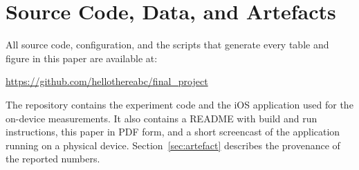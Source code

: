 \appendices

\section{Source Code, Data, and Artefacts}
\label{app:repository}

All source code, configuration, and the scripts that generate every table and
figure in this paper are available at:

\begin{center}
\url{https://github.com/hellothereabc/final_project}
\end{center}

The repository contains the experiment code and the iOS application used for
the on-device measurements. It also contains a README with build and run
instructions, this paper in PDF form, and a short screencast of the application
running on a physical device. Section~\ref{sec:artefact} describes the
provenance of the reported numbers.
